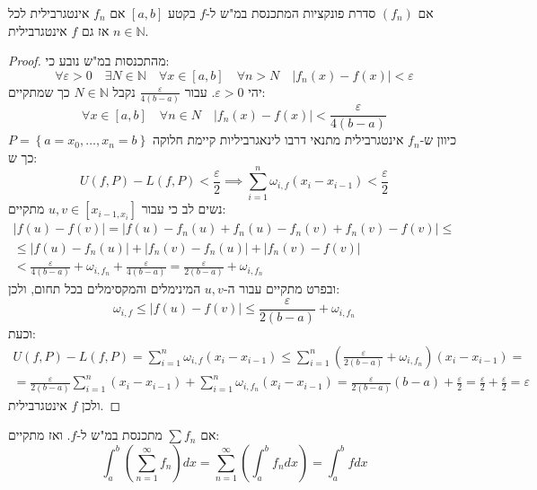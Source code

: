 \documentclass{tstextbook}
\begin{document}
\begin{proposition}
אם \((f_{n})\) סדרת פונקציות המתכנסת במ"ש ל-\(f\) בקטע \([a,b]\) אם \(f_{n}\) אינטגרבילית לכל \(n \in \mathbb{N}\) אז גם \(f\) אינטגרבילית.

\end{proposition}
\begin{proof}
מהתכנסות במ"ש נובע כי:
$$\forall\varepsilon>0\quad \exists N \in \mathbb{N} \quad \forall x \in \left[ a,b\right]\quad \forall n> N\quad \lvert f_{n}(x)-f(x) \rvert <\varepsilon$$
יהי \(\varepsilon>0\). עבור \(\frac{\varepsilon}{4(b-a)}\) נקבל \(N \in \mathbb{N}\) כך שמתקיים:
$$\forall x \in [a,b]\quad  \forall n \in N\quad \lvert f_{n}(x)-f(x) \rvert <\frac{\varepsilon}{4(b-a)}$$
כיוון ש-\(f_{n}\) אינטגרבילית מתנאי דרבו לינאגרביליות קיימת חלוקה \(P=\left\{  a=x_{0},\dots,x_{n}=b  \right\}\) כך ש:
$$U(f,P)-L(f,P)<\frac{\varepsilon}{2}\implies\sum_{i=1}^{n} \omega_{i,f}(x_{i}-x_{i-1})<\frac{\varepsilon}{2}$$
נשים לב כי עבור \(u,v \in [x_{i-1,x_{i}}]\) מתקיים:
\begin{gather*}\lvert f(u)-f(v) \rvert =\lvert f(u)-f_{n}(u)+f_{n}(u)-f_{n}(v)+f_{n}(v)-f(v) \rvert \leq \\\leq \lvert f(u)-f_{n}(u) \rvert +\lvert f_{n}(v)-f_{n}(u) \rvert +\lvert f_{n}(v)-f(v) \rvert  \\<\frac{\varepsilon}{4(b-a)}+\omega_{i,f_{n}}+\frac{\varepsilon}{4(b-a)}=\frac{\varepsilon}{2(b-a) }+\omega_{i,f_{n}}
\end{gather*}
ובפרט מתקיים עבור ה-\(u,v\) המינימלים והמקסימלים בכל תחום, ולכן:
$$\omega_{i,f}\leq \lvert f(u)-f(v) \rvert \leq \frac{\varepsilon}{2(b-a)}+\omega_{i,f_{n}}$$
וכעת:
\begin{gather*}U(f,P)-L(f,P)=\sum_{i=1}^{n}\omega_{i,f}(x_{i}-x_{i-1})\leq\sum_{i=1}^{n} \left( \frac{\varepsilon}{2(b-a)}+\omega_{i, f_{n}} \right)(x_{i}-x_{i-1})=  \\=\frac{\varepsilon}{2(b-a)}\sum_{i=1}^{n}(x_{i}-x_{i-1})+\sum_{i=1}^{n} \omega_{i,f_{n}}(x_{i}-x_{i-1})=\frac{\varepsilon}{2(b-a) }(b-a)+\frac{\varepsilon}{2}=\frac{\varepsilon}{2}+\frac{\varepsilon}{2}=\varepsilon 
\end{gather*}
ולכן \(f\) אינטגרבילית.

\end{proof}
\begin{proposition}
אם \(\sum f_n\) מתכנסת במ"ש ל-\(f\). ואז מתקיים:
 $$\int_a^b \left(\sum_{n=1}^\infty f_n\right) dx=\sum_{n=1}^\infty \left(\int_a^b f_n dx\right)=\int_a^b f dx$$

\end{proposition}
\end{document}
